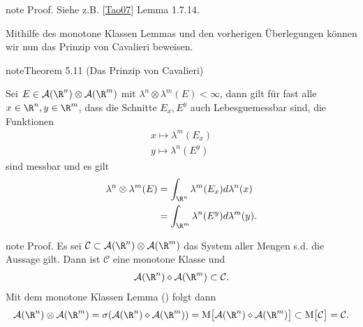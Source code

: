 \documentclass[letterpaper,10pt,german]{jupyterBook}
\begin{document}
\begin{sphinxadmonition}{note}
\sphinxAtStartPar
Proof. Siehe z.B. {[}\hyperlink{cite.references:id6}{Tao07}{]} Lemma 1.7.14.
\end{sphinxadmonition}

\sphinxAtStartPar
Mithilfe des monotone Klassen Lemmas und den vorherigen Überlegungen können wir nun das Prinzip von Cavalieri beweisen.
\label{masstheorie/integrationstechnik:thm:cavalieri}
\begin{sphinxadmonition}{note}{Theorem 5.11 (Das Prinzip von Cavalieri)}



\sphinxAtStartPar
Sei \(E \in \mathcal{A}(\R^n)\otimes\mathcal{A}(\R^m)\) mit \(\lambda^{n}\otimes\lambda^{m}(E) < \infty\),
dann gilt für fast alle \(x\in\R^n,y\in\R^m\), dass die Schnitte \(E_x, E^y\) auch Lebesgue\sphinxhyphen{}messbar sind, die Funktionen
\begin{equation*}
\begin{split}x \mapsto \lambda^m(E_x)\\
y \mapsto \lambda^n(E^y)\end{split}
\end{equation*}
\sphinxAtStartPar
sind messbar und es gilt
\begin{equation*}
\begin{split}\lambda^{n}\otimes\lambda^{m}(E) &= \int_{\R^n} \lambda^m(E_x) d\lambda^n(x)\\
&=
\int_{\R^m} \lambda^n(E^y) d\lambda^m(y).\end{split}
\end{equation*}\end{sphinxadmonition}

\begin{sphinxadmonition}{note}
\sphinxAtStartPar
Proof. Es sei \(\mathcal{C}\subset\mathcal{A}(\R^n)\otimes\mathcal{A}(\R^m)\) das System aller Mengen s.d. die Aussage gilt. Dann ist \(\mathcal{C}\) eine monotone Klasse und
\begin{equation*}
\begin{split}\mathcal{A}(\R^n)\diamond\mathcal{A}(\R^m)\subset \mathcal{C}.\end{split}
\end{equation*}
\sphinxAtStartPar
Mit dem monotone Klassen Lemma ({\hyperref[\detokenize{masstheorie/integrationstechnik:lem:monclass}]{}}) folgt dann
\begin{equation*}
\begin{split}\mathcal{A}(\R^n)\otimes\mathcal{A}(\R^m) = \sigma(\mathcal{A}(\R^n)\diamond\mathcal{A}(\R^m)) = 
\text{M}\big[\mathcal{A}(\R^n)\diamond\mathcal{A}(\R^m)\big] \subset 
\text{M}\big[\mathcal{C}\big] = \mathcal{C}.\end{split}
\end{equation*}\end{sphinxadmonition}
\end{document}
